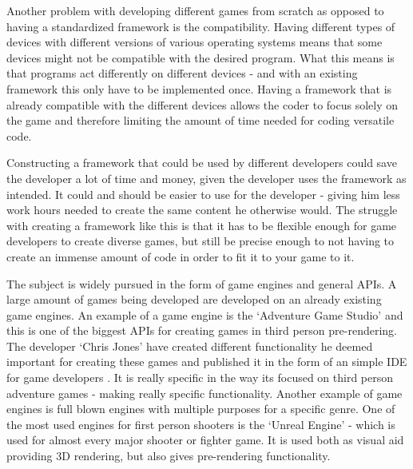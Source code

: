Another problem with developing different games from scratch as opposed to having a standardized framework is the compatibility. Having different types of devices with different versions of various operating systems means that some devices might not be compatible with the desired program. What this means is that programs act differently on different devices - and with an existing framework this only have to be implemented once. Having a framework that is already compatible with the different devices allows the coder to focus solely on the game and therefore limiting the amount of time needed for coding versatile code.

Constructing a framework that could be used by different developers could save the developer a lot of time and money, given the developer uses the framework as intended. It could and should be easier to use for the developer - giving him less work hours needed to create the same content he otherwise would. The struggle with creating a framework like this is that it has to be flexible enough for game developers to create diverse games, but still be precise enough to not having to create an immense amount of code in order to fit it to your game to it.

The subject is widely pursued in the form of game engines and general APIs. A large amount of games being developed are developed on an already existing game engines. An example of a game engine is the `Adventure Game Studio' and this is one of the biggest APIs for creating games in third person pre-rendering. The developer `Chris Jones' have created different functionality he deemed important for creating these games and published it in the form of an simple IDE for game developers \cite{adv-game}. It is really specific in the way its focused on third person adventure games - making really specific functionality.
Another example of game engines is full blown engines with multiple purposes for a specific genre. One of the most used engines for first person shooters is the `Unreal Engine' - which is used for almost every major shooter or fighter game. It is used both as visual aid providing 3D rendering, but also gives pre-rendering functionality.




